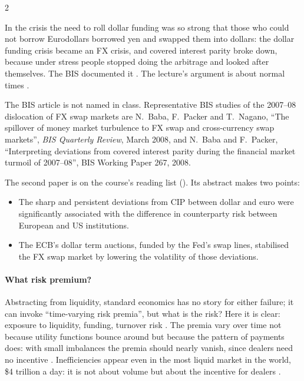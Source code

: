 \begin{paracol}{2}
\begin{finance}
In the crisis the need to roll dollar funding was so strong that those who could not borrow Eurodollars borrowed yen and swapped them into dollars: the dollar
funding crisis became an FX crisis, and covered interest parity broke down, because under stress people stopped doing the arbitrage and looked after themselves.
The BIS documented it . The lecture's argument is about normal times .
\end{finance}

\begin{coursenote}
The BIS article is not named in class. Representative BIS studies of the 2007--08 dislocation of FX swap markets are N.~Baba, F.~Packer and T.~Nagano, ``The
spillover of money market turbulence to FX swap and cross-currency swap markets'', \emph{BIS Quarterly Review}, March 2008, and N.~Baba and F.~Packer,
``Interpreting deviations from covered interest parity during the financial market turmoil of 2007--08'', BIS Working Paper 267, 2008.

The second paper is on the course's reading list (). Its abstract makes two points:
\begin{itemize}
  \item The sharp and persistent deviations from CIP between dollar and euro were significantly associated with the difference in counterparty risk between European and US institutions.
  \item The ECB's dollar term auctions, funded by the Fed's swap lines, stabilised the FX swap market by lowering the volatility of those deviations.
\end{itemize}
\end{coursenote}

\paragraph{What risk premium?} Abstracting from liquidity, standard economics has no story for either failure; it can invoke ``time-varying risk premia'', but what is
the risk? Here it is clear: exposure to liquidity, funding, turnover risk . The premia vary over time not because
utility functions bounce around but because the pattern of payments does: with small imbalances the premia should nearly vanish, since dealers need no
incentive . Inefficiencies appear even in the most liquid market in the world, \$4 trillion a day: it is not about
volume but about the incentive for dealers .


\end{paracol}
